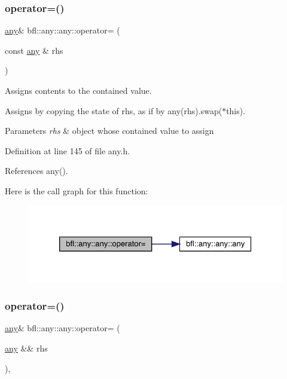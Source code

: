 \subsubsection{\texorpdfstring{operator=()}{operator=()}\hspace{0.1cm}{\footnotesize\ttfamily [1/3]}}
{\footnotesize\ttfamily \mbox{\hyperlink{classbfl_1_1any_1_1any}{any}}\& bfl\+::any\+::any\+::operator= (\begin{DoxyParamCaption}\item[{const \mbox{\hyperlink{classbfl_1_1any_1_1any}{any}} \&}]{rhs }\end{DoxyParamCaption})\hspace{0.3cm}{\ttfamily [inline]}}



Assigns contents to the contained value. 

Assigns by copying the state of rhs, as if by any(rhs).swap($\ast$this).


\begin{DoxyParams}{Parameters}
{\em rhs} & object whose contained value to assign \\
\hline
\end{DoxyParams}


Definition at line 145 of file any.\+h.



References any().

Here is the call graph for this function\+:
\nopagebreak
\begin{figure}[H]
\begin{center}
\leavevmode
\includegraphics[width=326pt]{classbfl_1_1any_1_1any_a067d769bffdf2782e8d1dc080f66d948_cgraph}
\end{center}
\end{figure}
\mbox{\label{classbfl_1_1any_1_1any_a65609849a81b0af40e6b86751ae0350c}} 
\subsubsection{\texorpdfstring{operator=()}{operator=()}\hspace{0.1cm}{\footnotesize\ttfamily [2/3]}}
{\footnotesize\ttfamily \mbox{\hyperlink{classbfl_1_1any_1_1any}{any}}\& bfl\+::any\+::any\+::operator= (\begin{DoxyParamCaption}\item[{\mbox{\hyperlink{classbfl_1_1any_1_1any}{any}} \&\&}]{rhs }\end{DoxyParamCaption})\hspace{0.3cm}{\ttfamily [inline]}, {\ttfamily [noexcept]}}



